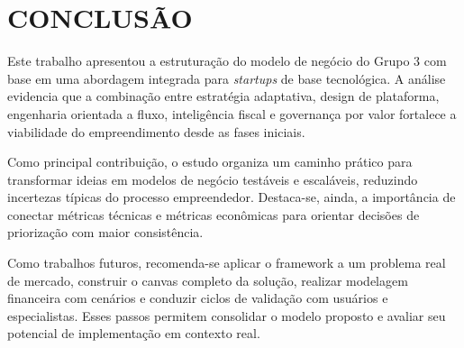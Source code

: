 \chapter{CONCLUSÃO}
\label{cap:conclusao}

Este trabalho apresentou a estruturação do modelo de negócio do Grupo 3 com base em uma abordagem integrada para \textit{startups} de base tecnológica. A análise evidencia que a combinação entre estratégia adaptativa, design de plataforma, engenharia orientada a fluxo, inteligência fiscal e governança por valor fortalece a viabilidade do empreendimento desde as fases iniciais.

Como principal contribuição, o estudo organiza um caminho prático para transformar ideias em modelos de negócio testáveis e escaláveis, reduzindo incertezas típicas do processo empreendedor. Destaca-se, ainda, a importância de conectar métricas técnicas e métricas econômicas para orientar decisões de priorização com maior consistência.

Como trabalhos futuros, recomenda-se aplicar o framework a um problema real de mercado, construir o canvas completo da solução, realizar modelagem financeira com cenários e conduzir ciclos de validação com usuários e especialistas. Esses passos permitem consolidar o modelo proposto e avaliar seu potencial de implementação em contexto real.
